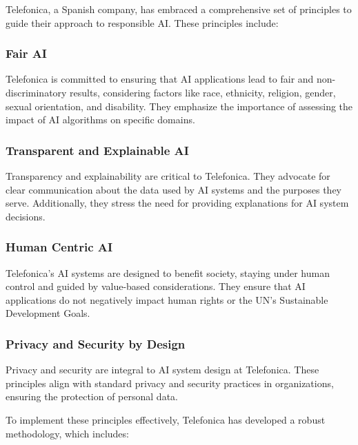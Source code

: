 \documentclass{article}
\begin{document}
Telefonica\cite{DBLP:journals/corr/abs-1909-12838}, a Spanish company, has embraced a comprehensive set of principles to guide their approach to responsible AI. These principles include:

\subsubsection{Fair AI}

Telefonica is committed to ensuring that AI applications lead to fair and non-discriminatory results, considering factors like race, ethnicity, religion, gender, sexual orientation, and disability. They emphasize the importance of assessing the impact of AI algorithms on specific domains.

\subsubsection{Transparent and Explainable AI}

Transparency and explainability are critical to Telefonica. They advocate for clear communication about the data used by AI systems and the purposes they serve. Additionally, they stress the need for providing explanations for AI system decisions.

\subsubsection{Human Centric AI}

Telefonica's AI systems are designed to benefit society, staying under human control and guided by value-based considerations. They ensure that AI applications do not negatively impact human rights or the UN's Sustainable Development Goals.

\subsubsection{Privacy and Security by Design}

Privacy and security are integral to AI system design at Telefonica. These principles align with standard privacy and security practices in organizations, ensuring the protection of personal data.

To implement these principles effectively, Telefonica has developed a robust methodology, which includes:
\end{document}
